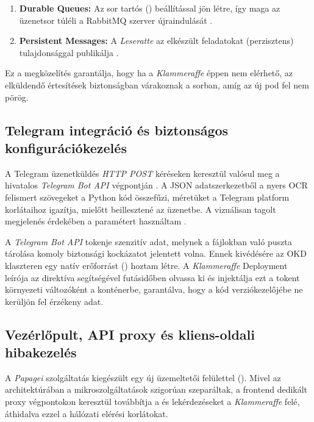 \documentclass[12pt]{article}
\begin{document}
	\begin{enumerate}
		\item \textbf{Durable Queues:} Az  sor tartós () beállítással jön létre, így maga az üzenetsor túléli a RabbitMQ szerver újraindulását \cite{rabbitmq-durability}.
		\item \textbf{Persistent Messages:} A \textit{Leseratte} az elkészült feladatokat  (perzisztens) tulajdonsággal publikálja \cite{rabbitmq-durability}.
	\end{enumerate}
	
	Ez a megközelítés garantálja, hogy ha a \textit{Klammeraffe} éppen nem elérhető, az elküldendő értesítések biztonságban várakoznak a sorban, amíg az új pod fel nem pörög.
	
	\subsection{Telegram integráció és biztonságos konfigurációkezelés}
	
	A Telegram üzenetküldés \textit{HTTP POST} kéréseken keresztül valósul meg a hivatalos \textit{Telegram Bot API}  végpontján \cite{telegram-send}. A JSON adatszerkezetből a nyers OCR felismert szövegeket a Python kód összefűzi, méretüket a Telegram platform korlátaihoz igazítja, mielőtt beillesztené az üzenetbe. A vizuálisan tagolt megjelenés érdekében a  paramétert használtam \cite{telegram-format}.
	
	A \textit{Telegram Bot API} tokenje szenzitív adat, melynek a  fájlokban való puszta tárolása komoly biztonsági kockázatot jelentett volna. Ennek kivédésére az OKD klaszteren egy natív  erőforrást () hoztam létre. A \textit{Klammeraffe} Deployment leírója az  direktíva segítségével futásidőben olvassa ki és injektálja ezt a tokent  környezeti változóként a konténerbe, garantálva, hogy a kód verziókezelőjébe ne kerüljön fel érzékeny adat.
	
	\subsection{Vezérlőpult, API proxy és kliens-oldali hibakezelés}
	
	A \textit{Papagei} szolgáltatás kiegészült egy új üzemeltetői felülettel (). Mivel az architektúrában a mikroszolgáltatások szigorúan szeparáltak, a frontend dedikált proxy végpontokon keresztül továbbítja a  és  lekérdezéseket a \textit{Klammeraffe} felé, áthidalva ezzel a hálózati elérési korlátokat.
	
\end{document}
